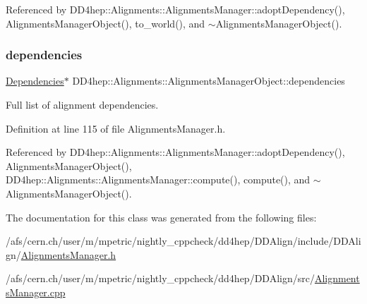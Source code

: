 Referenced by D\+D4hep\+::\+Alignments\+::\+Alignments\+Manager\+::adopt\+Dependency(), Alignments\+Manager\+Object(), to\+\_\+world(), and $\sim$\+Alignments\+Manager\+Object().

\hypertarget{class_d_d4hep_1_1_alignments_1_1_alignments_manager_object_ad936882d8b5fcccecb4a13821539413e}{}\label{class_d_d4hep_1_1_alignments_1_1_alignments_manager_object_ad936882d8b5fcccecb4a13821539413e} 
\subsubsection{\texorpdfstring{dependencies}{dependencies}}
{\footnotesize\ttfamily \hyperlink{class_d_d4hep_1_1_alignments_1_1_alignments_manager_object_a833ee244e731bbe8cf28bb209181dabc}{Dependencies}$\ast$ D\+D4hep\+::\+Alignments\+::\+Alignments\+Manager\+Object\+::dependencies}



Full list of alignment dependencies. 



Definition at line 115 of file Alignments\+Manager.\+h.



Referenced by D\+D4hep\+::\+Alignments\+::\+Alignments\+Manager\+::adopt\+Dependency(), Alignments\+Manager\+Object(), D\+D4hep\+::\+Alignments\+::\+Alignments\+Manager\+::compute(), compute(), and $\sim$\+Alignments\+Manager\+Object().



The documentation for this class was generated from the following files\+:\begin{DoxyCompactItemize}
\item 
/afs/cern.\+ch/user/m/mpetric/nightly\+\_\+cppcheck/dd4hep/\+D\+D\+Align/include/\+D\+D\+Align/\hyperlink{_alignments_manager_8h}{Alignments\+Manager.\+h}\item 
/afs/cern.\+ch/user/m/mpetric/nightly\+\_\+cppcheck/dd4hep/\+D\+D\+Align/src/\hyperlink{_alignments_manager_8cpp}{Alignments\+Manager.\+cpp}\end{DoxyCompactItemize}
